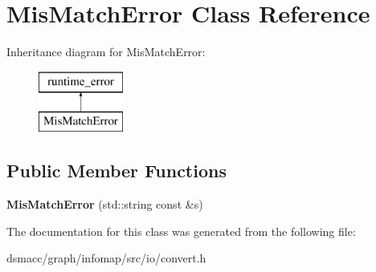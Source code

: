 \hypertarget{classMisMatchError}{}\section{Mis\+Match\+Error Class Reference}
\label{classMisMatchError}
Inheritance diagram for Mis\+Match\+Error\+:\begin{figure}[H]
\begin{center}
\leavevmode
\includegraphics[height=2.000000cm]{classMisMatchError}
\end{center}
\end{figure}
\subsection*{Public Member Functions}
\begin{DoxyCompactItemize}
\item 
\mbox{\label{classMisMatchError_a0de5e31e3ce37883b731c879b80cff5f}} 
{\bfseries Mis\+Match\+Error} (std\+::string const \&s)
\end{DoxyCompactItemize}


The documentation for this class was generated from the following file\+:\begin{DoxyCompactItemize}
\item 
dsmacc/graph/infomap/src/io/convert.\+h\end{DoxyCompactItemize}
